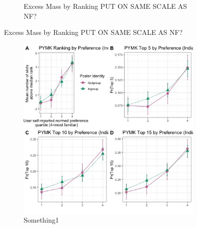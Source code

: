 \documentclass[12pt,letterpaper]{article}
\begin{document}
\begin{figure}[ht]
\begin{subfigure}{.5\textwidth}
        \caption{Excess Mass by Ranking PUT ON SAME SCALE AS NF?}
        \label{fig:pymk_bygroup_em_india}
    \end{subfigure}

\end{figure}

\begin{figure}[ht]
\caption{PYMK Results}
\label{fig:pymk_main}
    \begin{subfigure}{.5\textwidth} 
        \centering
        \includegraphics[width=1\linewidth]{Output/Graphs/Audit/Ranking line graphs/India PYMK all outcomes panel by norm preference by ingroup.jpg} 
        \caption{Something1}
        \label{fig:pymk_line_india}
        \end{subfigure}
    \begin{subfigure}{.5\textwidth}
        \centering

\end{subfigure}
\end{figure}
\end{document}
